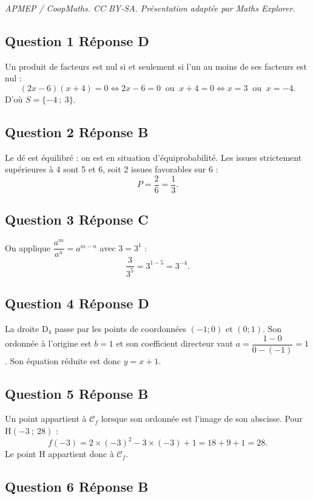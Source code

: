 \documentclass[10pt]{article}
\begin{document}
\noindent\textit{APMEP / CoopMaths. CC BY-SA. Présentation adaptée par Maths Explorer.}\par\medskip
\subsection*{Question 1 \quad Réponse D}

Un produit de facteurs est nul si et seulement si l'un au moins de ses facteurs est nul :
\[(2x - 6)(x + 4) = 0 \iff 2x - 6 = 0 \ \text{ ou } \ x + 4 = 0 \iff x = 3 \ \text{ ou } \ x = -4.\]
D'où $S = \{-4~;~3\}$.

\subsection*{Question 2 \quad Réponse B}

Le dé est équilibré : on est en situation d'équiprobabilité. Les issues strictement
supérieures à 4 sont 5 et 6, soit 2 issues favorables sur 6 :
\[P = \dfrac{2}{6} = \dfrac{1}{3}.\]

\subsection*{Question 3 \quad Réponse C}

On applique $\dfrac{a^m}{a^n} = a^{m-n}$ avec $3 = 3^1$ :
\[\dfrac{3}{3^5} = 3^{1-5} = 3^{-4}.\]

\subsection*{Question 4 \quad Réponse D}

La droite $\mathrm{D}_4$ passe par les points de coordonnées $(-1 ; 0)$ et $(0 ; 1)$. Son ordonnée à
l'origine est $b = 1$ et son coefficient directeur vaut
$a = \dfrac{1 - 0}{0 - (-1)} = 1$. Son équation réduite est donc $y = x + 1$.

\subsection*{Question 5 \quad Réponse B}

Un point appartient à $\mathcal{C}_f$ lorsque son ordonnée est l'image de son abscisse.
Pour H$(-3~;~28)$ :
\[f(-3) = 2\times(-3)^2 - 3\times(-3) + 1 = 18 + 9 + 1 = 28.\]
Le point H appartient donc à $\mathcal{C}_f$.

\subsection*{Question 6 \quad Réponse B}
\end{document}
